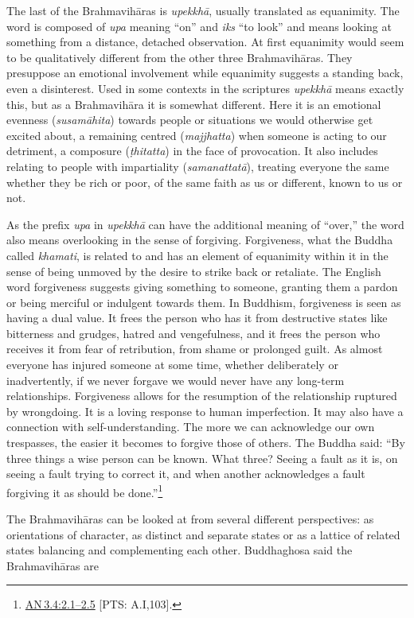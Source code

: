 \documentclass[10pt, openright]{book}
\begin{document}
The last of the Brahmavihāras is \textit{upekkhā}, usually translated as equanimity. The word is composed of \textit{upa} meaning “on” and \textit{iks} “to look” and means looking at something from a distance, detached observation. At first equanimity would seem to be qualitatively different from the other three Brahmavihāras. They presuppose an emotional involvement while equanimity suggests a standing back, even a disinterest. Used in some contexts in the scriptures \textit{upekkhā} means exactly this, but as a Brahmavihāra it is somewhat different. Here it is an emotional evenness (\textit{susamāhita}) towards people or situations we would otherwise get excited about, a remaining centred (\textit{majjhatta}) when someone is acting to our detriment, a composure (\textit{ṭhitatta}) in the face of provocation. It also includes relating to people with impartiality (\textit{samanattatā}), treating everyone the same whether they be rich or poor, of the same faith as us or different, known to us or not.


As the prefix \textit{upa} in \textit{upekkhā} can have the additional meaning of “over,” the word also means overlooking in the sense of forgiving. Forgiveness, what the Buddha called \textit{khamati}, is related to and has an element of equanimity within it in the sense of being unmoved by the desire to strike back or retaliate. The English word forgiveness suggests giving something to someone, granting them a pardon or being merciful or indulgent towards them. In Buddhism, forgiveness is seen as having a dual value. It frees the person who has it from destructive states like bitterness and grudges, hatred and vengefulness, and it frees the person who receives it from fear of retribution, from shame or prolonged guilt. As almost everyone has injured someone at some time, whether deliberately or inadvertently, if we never forgave we would never have any long-term relationships. Forgiveness allows for the resumption of the relationship ruptured by wrongdoing. It is a loving response to human imperfection. It may also have a connection with self-understanding. The more we can acknowledge our own trespasses, the easier it becomes to forgive those of others. The Buddha said: “By three things a wise person can be known. What three? Seeing a fault as it is, on seeing a fault trying to correct it, and when another acknowledges a fault forgiving it as should be done.”\footnote {\href{https://suttacentral.net/an3.4/en/sujato\#2.1}{AN 3.4:2.1–2.5} [PTS: A.I,103].}


The Brahmavihāras can be looked at from several different perspectives: as orientations of character, as distinct and separate states or as a lattice of related states balancing and complementing each other. Buddhaghosa said the Brahmavihāras are
\end{document}
